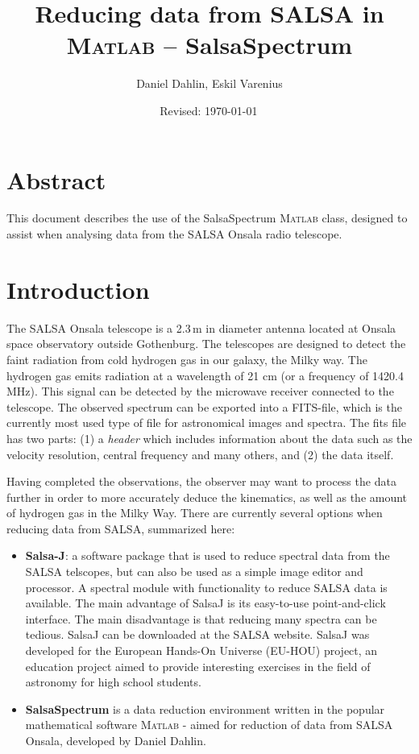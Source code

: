 \documentclass[11pt,a4paper]{article}
\begin{document}
\pagestyle{plain}
\title{\textsf{Reducing data from SALSA in \textsc{Matlab} -- {SalsaSpectrum}}}
\author{\textsf{Daniel Dahlin, Eskil Varenius}}
\yyyymmdddate
\date{\textsf{Revised: \today \, \currenttime}}
 

\maketitle

\section*{Abstract}
This document describes the use of the SalsaSpectrum \textsc{Matlab}
class, designed to assist when analysing data from the SALSA Onsala 
radio telescope. 

\tableofcontents

\section{Introduction}
\label{sec:introduction}

The SALSA Onsala telescope is a 2.3\,m in diameter antenna located at
Onsala space observatory outside Gothenburg. The telescopes are
designed to detect the faint radiation from cold hydrogen gas in our
galaxy, the Milky way. The hydrogen gas emits radiation at a
wavelength of 21 cm (or a frequency of 1420.4 MHz). This signal can be
detected by the microwave receiver connected to the telescope. 
The observed spectrum can be
exported into a FITS-file, which is the currently most used type of
file for astronomical images and spectra. The fits file has two parts:
(1) a \emph{header} which includes information
about the data such as the velocity resolution, central frequency and
many others, and (2) the data itself.

Having completed the observations, the observer may want to process
the data further in order to more accurately deduce the kinematics,
as well as the amount of hydrogen gas in the Milky Way. There are
currently several options when reducing data from SALSA,
summarized here:

\begin{itemize}
\item \textbf{Salsa-J}: a software package that is used to reduce
  spectral data from the SALSA telscopes, but can also be used as a
  simple image editor and processor. A spectral module with
  functionality to reduce SALSA data is available. The main advantage
  of SalsaJ is its easy-to-use point-and-click interface. The main
  disadvantage is that reducing many spectra can be tedious. SalsaJ
  can be downloaded at the SALSA website. SalsaJ was developed for 
  the European Hands-On Universe (EU-HOU) project, an
  education project aimed to provide interesting exercises in the
  field of astronomy for high school students.
\item \textbf{SalsaSpectrum} is a data reduction environment written
  in the popular mathematical software \textsc{\textsc{Matlab}} -
  aimed for reduction of data from SALSA Onsala, developed by Daniel
  Dahlin.
\end{itemize}
\end{document}
